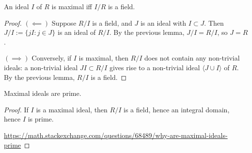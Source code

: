 \begin{lemma}
An ideal $I$ of $R$ is maximal iff $I/R$ is a field.
\end{lemma}
\begin{proof}
$(\impliedby)$ Suppose $R/I$ is a field, and $J$  is an ideal with $I\subset J$. Then $J/I:=\{jI: j\in J\}$ is an ideal of $R/I$. By the previous lemma, $J/I=R/I$, so $J=R$.

$(\implies)$ Conversely, if $I$ is maximal, then $R/I$ does not contain any non-trivial ideals: a non-trivial ideal $JI\subset R/I$ gives rise to a non-trivial ideal $\langle J\cup I\rangle$ of $R$. By the previous lemma, $R/I$ is a field.
\end{proof}

\begin{corollary}
Maximal ideals are prime.
\end{corollary}
\begin{proof}
If $I$ is a maximal ideal, then $R/I$ is a field, hence an integral domain, hence $I$ is prime.

\url{https://math.stackexchange.com/questions/68489/why-are-maximal-ideals-prime}
\end{proof}